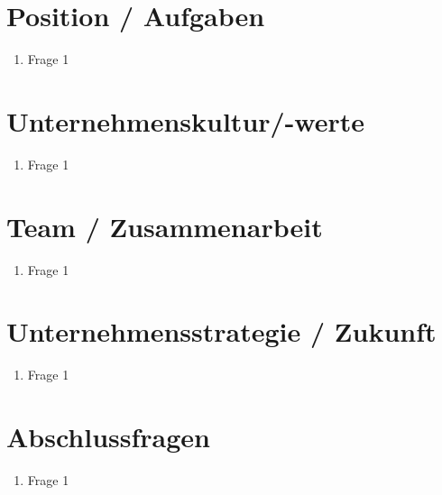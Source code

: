 \documentclass{scrartcl}
\begin{document}
    \section{Position / Aufgaben}\label{sec:position-/-aufgaben}
    \begin{enumerate}
        \item Frage 1
    \end{enumerate}


    \section{Unternehmenskultur/-werte}\label{sec:unternehmenskultur/-werte}
    \begin{enumerate}
        \item Frage 1
    \end{enumerate}


    \section{Team / Zusammenarbeit}\label{sec:team-/-zusammenarbeit}
    \begin{enumerate}
        \item Frage 1
    \end{enumerate}


    \section{Unternehmensstrategie / Zukunft}\label{sec:unternehmensstrategie-/-zukunft}
    \begin{enumerate}
        \item Frage 1
    \end{enumerate}


    \section{Abschlussfragen}\label{sec:abschlussfragen}
    \begin{enumerate}
        \item Frage 1
    \end{enumerate}
\end{document}
